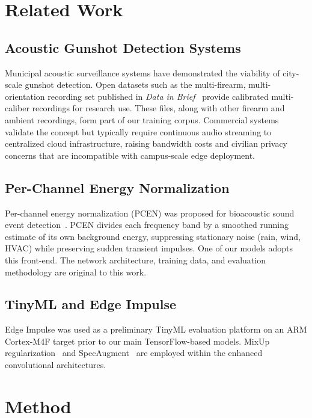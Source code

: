 \documentclass[conference]{IEEEtran}
\begin{document}
\section{Related Work}
\label{sec:related}

\subsection{Acoustic Gunshot Detection Systems}
Municipal acoustic surveillance systems have demonstrated the viability of city-scale gunshot detection. Open datasets such as the multi-firearm, multi-orientation recording set published in \emph{Data in Brief}~\cite{dib2023} provide calibrated multi-caliber recordings for research use. These files, along with other firearm and ambient recordings, form part of our training corpus. Commercial systems validate the concept but typically require continuous audio streaming to centralized cloud infrastructure, raising bandwidth costs and civilian privacy concerns that are incompatible with campus-scale edge deployment.

\subsection{Per-Channel Energy Normalization}
Per-channel energy normalization (PCEN) was proposed for bioacoustic sound event detection~\cite{lostanlen2019}. PCEN divides each frequency band by a smoothed running estimate of its own background energy, suppressing stationary noise (rain, wind, HVAC) while preserving sudden transient impulses. One of our models adopts this front-end. The network architecture, training data, and evaluation methodology are original to this work.

\subsection{TinyML and Edge Impulse}
Edge Impulse was used as a preliminary TinyML evaluation platform on an ARM Cortex-M4F target prior to our main TensorFlow-based models. MixUp regularization~\cite{zhang2018} and SpecAugment~\cite{park2019} are employed within the enhanced convolutional architectures.

\section{Method}
\label{sec:method}
\end{document}
